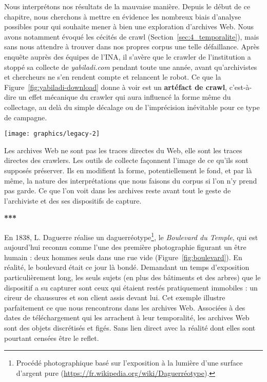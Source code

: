\documentclass[symmetric,justified,marginals=raggedouter]{tufte-book}
\begin{document}
Nous interprétons nos résultats de la mauvaise manière. Depuis le début de ce chapitre, nous cherchons à mettre en évidence les nombreux biais d'analyse possibles pour qui souhaite mener à bien une exploration d'ar\-chives Web. Nous avons notamment évoqué les cécités de crawl (Section~\ref{sec:4_temporalite}), mais sans nous attendre à trouver dans nos propres corpus une telle défaillance. Après enquête auprès des équipes de l'INA, il s'avère que le crawler de l'institution a stoppé sa collecte de \textit{yabiladi.com} pendant toute une année, avant qu'archivistes et chercheurs ne s'en rendent compte et relancent le robot. Ce que la Figure~\ref{fig:yabiladi-download} donne à voir est un \textbf{artéfact de crawl}, c'est-à-dire un effet mécanique du crawler qui aura influencé la forme même du collectage, au delà du simple décalage ou de l'imprécision inévitable pour ce type de campagne. 

\begin{figure*}
  \centering
  \texttt{[image: graphics/legacy-2]}
  \caption{"Boulevard du Temple", Louis Daguerre, 1838}
  \label{fig:boulevard}
\end{figure*}

\noindent Les archives Web ne sont pas les traces directes du Web, elle sont les traces directes des crawlers. Les outils de collecte façonnent l'image de ce qu'ils sont supposés préserver. Ils en modifient la forme, potentiellement le fond, et par là même, la nature des interprétations que nous faisons du corpus si l'on n'y prend pas garde. Ce que l'on voit dans les archives reste avant tout le geste de l'archiviste et des ses dispositifs de capture. 

\begin{center}
	\textbf{***}
\end{center}

\noindent En 1838, L. Daguerre réalise un daguerréotype\footnote{\RaggedOuter Procédé photographique basé sur l'exposition à la lumière d'une surface d'argent pure (\url{https://fr.wikipedia.org/wiki/Daguerréotype}).}, le \textit{Boulevard du Temple}, qui est aujourd'hui reconnu comme l'une des première photographie figurant un être humain : deux hommes seuls dans une rue vide (Figure~\ref{fig:boulevard}). En réalité, le boulevard était ce jour là bondé. Demandant un temps d'exposition particulièrement long, les seuls sujets (en plus des bâtiments et des arbres) que le dispositif a su capturer sont ceux qui étaient restés pratiquement immobiles : un cireur de chaussures et son client assis devant lui. Cet exemple illustre parfaitement ce que nous rencontrons dans les archives Web. Associées à des dates de téléchargement qui les arrachent à leur temporalité, les archives Web sont des objets discrétisés et figés. Sans lien direct avec la réalité dont elles sont pourtant censées être le reflet. 
\end{document}
